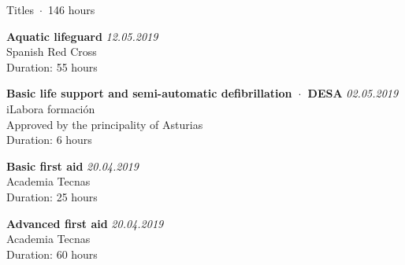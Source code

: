 \documentclass{resume} %
\begin{document}
\begin{rSection}{Titles~$\cdot$~146 hours}

{\bf  Aquatic lifeguard} \hfill {\em 12.05.2019} \\ 
Spanish Red Cross \\
Duration: 55 hours

{\bf  Basic life support and semi-automatic defibrillation~$\cdot$~DESA} \hfill {\em 02.05.2019} \\ 
iLabora formación \\
Approved by the principality of Asturias \\
Duration: 6 hours

{\bf  Basic first aid} \hfill {\em 20.04.2019} \\ 
Academia Tecnas \\
Duration: 25 hours

{\bf  Advanced first aid} \hfill {\em 20.04.2019} \\ 
Academia Tecnas \\
Duration: 60 hours

\end{rSection}

\end{document}

